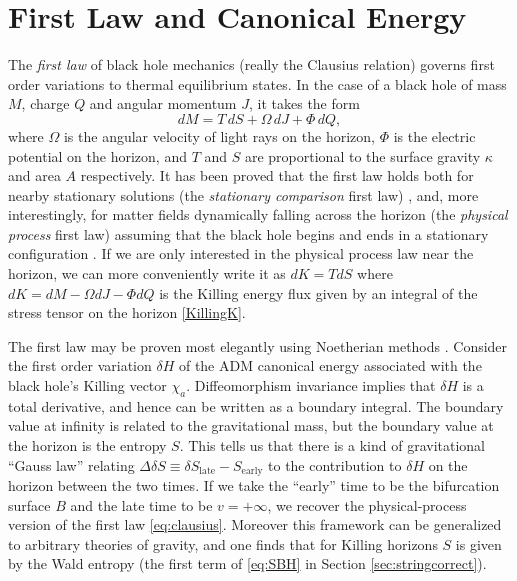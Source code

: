 \documentclass[12pt]{article}
\def\be{\begin{equation}}
\def\ee{\end{equation}}
\begin{document}
\section{First Law and Canonical Energy}\label{sec:1st}
The \emph{first law} of black hole mechanics (really the Clausius relation) governs first order variations to thermal equilibrium states. In the case of a black hole of mass $M$, charge $Q$ and angular momentum $J$, it takes the form
\be \label{eq:clausius}
dM = T \,dS + \Omega \,dJ + \Phi \, dQ,
\ee
where $\Omega$ is the angular velocity of light rays on the horizon, $\Phi$ is the electric potential on the horizon, and $T$ and $S$ are proportional to the surface gravity $\kappa$ and area $A$ respectively.  It has been proved that the first law holds both for nearby stationary solutions (the \emph{stationary comparison} first law) \cite{bardeen1973four}, and, more interestingly, for matter fields dynamically falling across the horizon (the \emph{physical process} first law) assuming that the black hole begins and ends in a stationary configuration \cite{wald1994quantum,Gao:2001ut}.  If we are only interested in the physical process law near the horizon, we can more conveniently write it as $dK = T dS$ where $dK = dM - \Omega dJ - \Phi dQ$ is the Killing energy flux given by an integral of the stress tensor on the horizon \eqref{KillingK}.

The first law may be proven most elegantly using Noetherian methods \cite{wald1993black,JKM,iyer1994some,Gao:2001ut}.  Consider the first order variation $\delta H$ of the ADM canonical energy associated with the black hole's Killing vector $\chi_a$.  Diffeomorphism invariance implies that $\delta H$ is a total derivative, and hence can be written as a boundary integral.  The boundary value at infinity is related to the gravitational mass, but the boundary value at the horizon is the entropy $S$.  This tells us that there is a kind of gravitational ``Gauss law'' relating $\Delta \delta S \equiv \delta S_\text{late} - S_\text{early}$ to the contribution to $\delta H$ on the horizon between the two times.  If we take the ``early'' time to be the bifurcation surface $B$ and the late time to be $v = +\infty$, we recover the physical-process version of the first law \eqref{eq:clausius}.  Moreover this framework can be generalized to arbitrary theories of gravity, and one finds that for Killing horizons $S$ is given by the Wald entropy (the first term of \eqref{eq:SBH} in Section \ref{sec:stringcorrect}).
\end{document}
